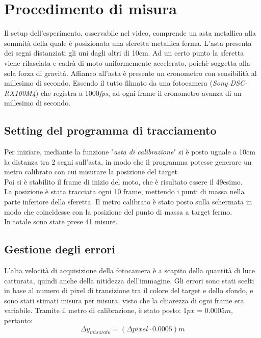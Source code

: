 \documentclass[12pt, a4paper]{article}
\begin{document}
\section{Procedimento di misura}
Il setup dell'esperimento, osservabile nel video, comprende un asta metallica alla sommità della quale è posizionata una sferetta metallica ferma. L'asta presenta dei segni distanziati gli uni dagli altri di 10cm. 
Ad un certo punto la sferetta viene rilasciata e cadrà di moto uniformemente accelerato, poichè soggetta alla sola forza di gravità. Affianco all'asta è presente un cronometro con sensibilità al millesimo di secondo. 
Essendo il tutto filmato da una fotocamera (\textit{Sony DSC-RX100M4}) che registra a 1000\textit{fps}, ad ogni frame il cronometro avanza di un millesimo di secondo.

  
\subsection{Setting del programma di tracciamento}
Per iniziare, mediante la funzione "\textit{asta di calibrazione}" si è posto uguale a 10cm la distanza tra 2 segni sull'asta, in modo che il programma potesse generare un metro calibrato con cui misurare la posizione del target. \\
Poi si è stabilito il frame di inizio del moto, che è risultato essere il 49esimo.  \\
La posizione è stata tracciata ogni 10 frame, mettendo i punti di massa nella parte inferiore della sferetta. Il metro calibrato è stato posto sulla schermata in modo che coincidesse con la posizione del punto di massa a target fermo.\\
In totale sono state prese 41 misure.


\subsection{Gestione degli errori}
L'alta velocità di acquisizione della fotocamera è a scapito della quantità di luce catturata, quindi anche della nitidezza dell'immagine.
Gli errori sono stati scelti in base al numero di pixel di transizione tra il colore del target e dello sfondo, e sono stati stimati misura per misura, visto che la chiarezza di ogni frame era variabile. Tramite il metro di calibrazione, è stato posto: 1$px$ = 0.0005$m$, pertanto:
\begin{equation*}
    \Delta y_{misurato}= (\Delta pixel \cdot 0.0005)m
\end{equation*}
\end{document}
